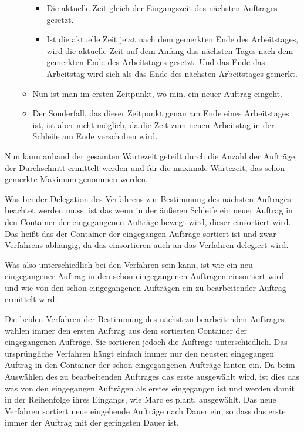 \documentclass[a4paper,10pt,ngerman]{scrartcl}
\begin{document}
\begin{itemize}
\begin{itemize}
		            \begin{itemize}
			            \item Die aktuelle Zeit gleich der Eingangszeit des nächsten Auftrages gesetzt.
			            \item Ist die aktuelle Zeit jetzt nach dem gemerkten Ende des Arbeitstages,
			                  wird die aktuelle Zeit auf dem Anfang das nächsten Tages nach dem gemerkten Ende des Arbeitstages gesetzt.
			                  Und das Ende das Arbeitstag wird sich als das Ende des nächsten Arbeitstages gemerkt.
		            \end{itemize}
		      \item Nun ist man im ersten Zeitpunkt, wo min. ein neuer Auftrag eingeht.
		      \item Der Sonderfall, das dieser Zeitpunkt genau am Ende eines Arbeitstages ist,
		            ist aber nicht möglich, da die Zeit zum neuen Arbeitstag in der Schleife am Ende verschoben wird.
	      \end{itemize}
\end{itemize}
Nun kann anhand der gesamten Wartezeit geteilt durch die Anzahl der Aufträge,
der Durchschnitt ermittelt werden
und für die maximale Wartezeit, das schon gemerkte Maximum genommen werden.

Was bei der Delegation des Verfahrens zur Bestimmung des nächsten Auftrages beachtet werden muss,
ist das wenn in der äußeren Schleife ein neuer Auftrag in den Container
der eingegangenen Aufträge bewegt wird,
dieser einsortiert wird. Das heißt das der Container der eingegangen Aufträge sortiert ist
und zwar Verfahrens abhängig,
da das einsortieren auch an das Verfahren delegiert wird.

Was also unterschiedlich bei den Verfahren sein kann, ist wie ein neu eingegangener Auftrag
in den schon eingegangenen Aufträgen einsortiert wird
und wie von den schon eingegangenen Aufträgen ein zu bearbeitender Auftrag ermittelt wird.

Die beiden Verfahren der Bestimmung des nächst zu bearbeitenden Auftrages wählen immer den ersten Auftrag
aus dem sortierten Container der eingegangenen Aufträge.
Sie sortieren jedoch die Aufträge unterschiedlich.
Das ursprüngliche Verfahren hängt einfach immer nur den neusten eingegangen Auftrag
in den Container der schon eingegangenen Aufträge hinten ein.
Da beim Auswählen des zu bearbeitenden Auftrages das erste ausgewählt wird,
ist dies das was von den eingegangen Aufträgen als erstes eingegangen ist
und werden damit in der Reihenfolge ihres Eingangs, wie Marc es plant, ausgewählt.
Das neue Verfahren sortiert neue eingehende Aufträge nach Dauer ein,
so dass das erste immer der Auftrag mit der geringsten Dauer ist.
\end{document}

